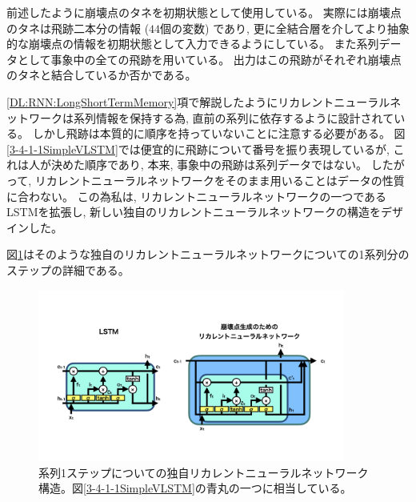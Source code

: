 \newpage
前述したように崩壊点のタネを初期状態として使用している。
実際には崩壊点のタネは飛跡二本分の情報 ($44$個の変数) であり, 更に全結合層を介してより抽象的な崩壊点の情報を初期状態として入力できるようにしている。
また系列データとして事象中の全ての飛跡を用いている。
出力はこの飛跡がそれぞれ崩壊点のタネと結合しているか否かである。

\ref{DL:RNN:LongShortTermMemory}項で解説したようにリカレントニューラルネットワークは系列情報を保持する為, 直前の系列に依存するように設計されている。
しかし飛跡は本質的に順序を持っていないことに注意する必要がある。
図\ref{3-4-1-1SimpleVLSTM}では便宜的に飛跡について番号を振り表現しているが, これは人が決めた順序であり, 本来, 事象中の飛跡は系列データではない。
したがって, リカレントニューラルネットワークをそのまま用いることはデータの性質に合わない。
この為私は, リカレントニューラルネットワークの一つであるLSTMを拡張し, 新しい独自のリカレントニューラルネットワークの構造をデザインした。

図\ref{3-4-1-2VLSTMStructure}はそのような独自のリカレントニューラルネットワークについての1系列分のステップの詳細である。

\begin{figure}[htbp]
 \centering
 \includegraphics[trim = 0 100 0 200, width=0.9\textwidth, clip]{Figure/3Networks/3-4-1-2VLSTMStructure.png}
 \caption[系列1ステップについての独自リカレントニューラルネットワーク構造]{系列1ステップについての独自リカレントニューラルネットワーク構造。図\ref{3-4-1-1SimpleVLSTM}の青丸の一つに相当している。}
 \label{3-4-1-2VLSTMStructure}
\end{figure}

